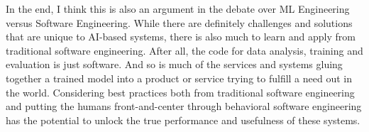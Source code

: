 \documentclass[a4paper,twocolumn]{article}
\begin{document}
In the end, I think this is also an argument in the debate over ML Engineering
versus Software Engineering. While there are definitely challenges and solutions
that are unique to AI-based systems, there is also much to learn and apply from
traditional software engineering. After all, the code for data analysis,
training and evaluation is just software. And so is much of the services and
systems gluing together a trained model into a product or service trying to
fulfill a need out in the world. Considering best practices both from
traditional software engineering and putting the humans front-and-center through
behavioral software engineering has the potential to unlock the true performance
and usefulness of these systems.



\end{document}
